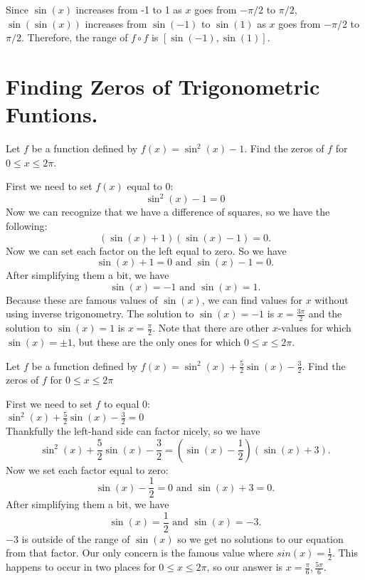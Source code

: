 \documentclass{ximera}
\begin{document}
\begin{example}
\begin{explanation}
\begin{enumerate}
Since $\sin(x)$ increases from -1 to 1 as $x$ goes from $-\pi/2$ to $\pi/2$, $\sin(\sin(x))$ increases from $\sin(-1)$ to $\sin(1)$ as $x$ goes from $-\pi/2$ to $\pi/2$. Therefore, the range of $f \circ f$ is $[\sin(-1), \sin(1)]$. 
\end{enumerate}
\end{explanation}
\end{example}

\section{Finding Zeros of Trigonometric Funtions.}
\begin{example}
Let $f$ be a function defined by $f(x)=\sin^2(x)-1$. Find the zeros of $f$ for $0\leq x \leq 2\pi$.
\begin{explanation}
First we need to set $f(x)$ equal to $0$:\\
\[
\sin^2(x)-1=0
\]
Now we can recognize that we have a difference of squares, so we have the following:
\[
(\sin(x)+1)(\sin(x)-1) = 0.
\]
Now we can set each factor on the left equal to zero. So we have
\[
\sin(x)+1=0 \text{ and } \sin(x)-1 =0.
\]
After simplifying them a bit, we have
\[
\sin(x) =-1 \text{ and } \sin(x)=1.
\]
Because these are famous values of $\sin(x)$, we can find values for $x$ without using inverse trigonometry. The solution to $\sin(x) = -1$ is $x = \frac{3\pi}{2}$ and the solution to $\sin(x) = 1$ is $x = \frac{\pi}{2}$. Note that there are other $x$-values for which $\sin(x) = \pm 1$, but these are the only ones for which $0 \le x \le 2\pi$. 
\end{explanation}
\end{example}

\begin{example}
Let $f$ be a function defined by $f(x)=\sin^2(x)+\frac{5}{2}\sin(x)-\frac{3}{2}$. Find the zeros of $f$ for $0\leq x \leq 2\pi$
\begin{explanation}
First we need to set $f$ to equal $0$:\\
$\sin^2(x)+\frac{5}{2}\sin(x)-\frac{3}{2}=0$\\
Thankfully the left-hand side can factor nicely, so we have\\
\[
\sin^2(x)+\frac{5}{2}\sin(x)-\frac{3}{2}= \left(\sin(x)-\frac{1}{2}\right)(\sin(x)+3).
\]
Now we set each factor equal to zero:
\[
\sin(x)-\frac{1}{2}=0 \text{ and } \sin(x)+3 =0.
\]
After simplifying them a bit, we have
\[
\sin(x) = \frac{1}{2} \text{ and } \sin(x)=-3.
\]
$-3$ is outside of the range of $\sin(x)$ so we get no solutions to our equation from that factor. Our only concern is the famous value where $sin(x) = \frac{1}{2}$. This happens to occur in two places for $0\leq x \leq 2\pi$, so our answer is $x=\frac{\pi}{6},\frac{5\pi}{6}$.
\end{explanation}
\end{example}
\end{document}
